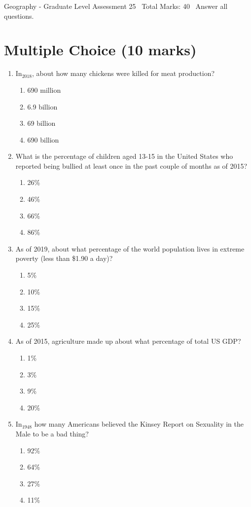 \documentclass[12pt]{article}
\begin{document}
\begin{center}
Geography - Graduate Level Assessment 25 \
Total Marks: 40 \
Answer all questions.
\end{center}

\section*{Multiple Choice (10 marks)}
\begin{enumerate}[label=\arabic*.]
\item In$_{2018}$, about how many chickens were killed for meat production?
\begin{enumerate}[label=(\alph*)]
    \item 690 million
    \item 6.9 billion
    \item 69 billion
    \item 690 billion
\end{enumerate}
\item What is the percentage of children aged 13-15 in the United States who reported being bullied at least once in the past couple of months as of 2015?
\begin{enumerate}[label=(\alph*)]
    \item 26\%
    \item 46\%
    \item 66\%
    \item 86\%
\end{enumerate}
\item As of 2019, about what percentage of the world population lives in extreme poverty (less than \$1.90 a day)?
\begin{enumerate}[label=(\alph*)]
    \item 5\%
    \item 10\%
    \item 15\%
    \item 25\%
\end{enumerate}
\item As of 2015, agriculture made up about what percentage of total US GDP?
\begin{enumerate}[label=(\alph*)]
    \item 1\%
    \item 3\%
    \item 9\%
    \item 20\%
\end{enumerate}
\item In$_{1948}$ how many Americans believed the Kinsey Report on Sexuality in the Male to be a bad thing?
\begin{enumerate}[label=(\alph*)]
    \item 92\%
    \item 64\%
    \item 27\%
    \item 11\%
\end{enumerate}
\end{enumerate}
\end{document}
